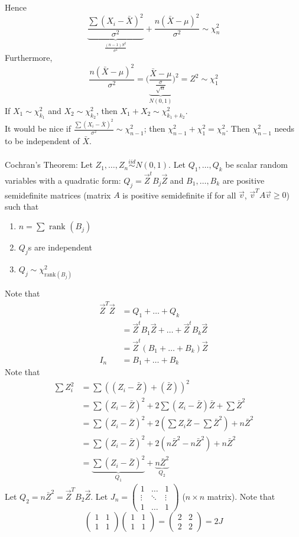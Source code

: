\documentclass[12pt]{article}
\newcommand{\iid}{\stackrel{iid}{\sim}}
\begin{document}
Hence $$\underbrace{\frac{\sum (X_i - \bar{X})^2}{\sigma^2}}_{\frac{(n-1)S^2}{\sigma^2}} + \frac{n(\bar{X} - \mu)^2}{\sigma^2} \sim \chi_n^2$$ 
Furthermore, $$ \frac{n(\bar{X} - \mu)^2}{\sigma^2} = \Bigg(\underbrace{\frac{\bar{X} - \mu}{\frac{\sigma}{\sqrt{n}}}}_{N(0,1)}\Bigg)^2 = Z^2 \sim \chi_1^2 $$ 
If $X_1 \sim \chi_{k_1}^2$ and $X_2 \sim \chi_{k_2}^2$, then $X_1 + X_2 \sim \chi^2_{k_1 + k_2}$. \\
It would be nice if $\frac{\sum (X_i - \bar{X})^2}{\sigma^2} \sim \chi^2_{n-1}$; then $\chi^2_{n -1} + \chi_1^2 = \chi_n^2$. Then $\chi_{n-1}^2$ needs to be independent of $\bar{X}$. \\~\\
Cochran's Theorem: Let $Z_1, \dots, Z_n \iid N(0,1)$. Let $Q_1, \dots, Q_k$ be scalar random variables with a quadratic form: $Q_j = \vec{Z}^tB_j\vec{Z}$ and $B_1, \dots, B_k$ are positive semidefinite matrices (matrix $A$ is positive semidefinite if for all $\vec{v}$, $\vec{v}^TA\vec{v} \geq 0$) such that  \begin{enumerate} 
\item $n = \sum \text{ rank }(B_j)$ 
\item $Q_j$s are independent 
\item $Q_j \sim \chi^2_{\text{rank}(B_j)}$ \end{enumerate} 
Note that $$ \begin{aligned} \vec{Z}^T\vec{Z} &= Q_1 + \dots + Q_k \\ &= \vec{Z}^tB_1\vec{Z} + \dots + \vec{Z}^tB_k\vec{Z} \\ &= \vec{Z}^t(B_1 + \dots + B_k)\vec{Z} \\ I_n &= B_1 + \dots + B_k \end{aligned} $$ 
Note that $$ \begin{aligned} \sum Z_i^2 &= \sum ((Z_i - \bar{Z}) + (\bar{Z}))^2 \\ &= \sum (Z_i - \bar{Z})^2 + 2\sum (Z_i - \bar{Z})\bar{Z} + \sum \bar{Z}^2 \\ &= \sum (Z_i - \bar{Z})^2 + 2(\sum Z_i \bar{Z} - \sum \bar{Z}^2) + n\bar{Z}^2 \\ &= \sum (Z_i - \bar{Z})^2 + 2(n\bar{Z}^2- n\bar{Z}^2) + n\bar{Z}^2 \\ &= \underbrace{\sum (Z_i - \bar{Z})^2}_{Q_1} + \underbrace{n\bar{Z}^2}_{Q_2} \end{aligned} $$ 
Let $Q_2 = n\bar{Z}^2 = \vec{Z}^TB_2\vec{Z}$. Let $J_n = \begin{pmatrix} 1 & \dots & 1 \\ \vdots & \ddots & \vdots \\ 1 & \dots & 1 \end{pmatrix}$ ($n \times n$ matrix). Note that $$\begin{pmatrix} 1 & 1 \\ 1 & 1 \end{pmatrix} \begin{pmatrix} 1 & 1 \\ 1 & 1 \end{pmatrix} = \begin{pmatrix} 2 & 2 \\ 2 & 2 \end{pmatrix} = 2J $$ 
\end{document}
